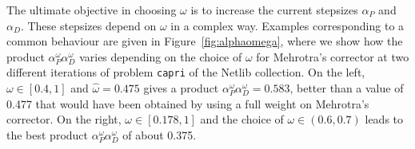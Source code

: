 
The ultimate objective in choosing $\omega$ is to increase 
the current stepsizes 
$\alpha_P$ and $\alpha_D$. These stepsizes depend on $\omega$ 
in a complex way. Examples corresponding to a common behaviour 
are given in Figure~\ref{fig:alphaomega}, where we show how the
product $\alpha^\omega_P\alpha^\omega_D$
varies depending on the choice of $\omega$ for Mehrotra's corrector at 
two different iterations of problem {\tt capri} of the Netlib collection.
On the left, $\omega \in [0.4, 1]$ and $\hat\omega=0.475$ gives a product
$\alpha^\omega_P\alpha^\omega_D=0.583$, 
better than a value of 0.477 that would have
been obtained by using a full weight on Mehrotra's corrector.
On the right, $\omega \in [0.178, 1]$ and the choice of 
$\omega \in (0.6, 0.7)$ leads to the best 
product $\alpha^\omega_P\alpha^\omega_D$ of about 0.375.
%
